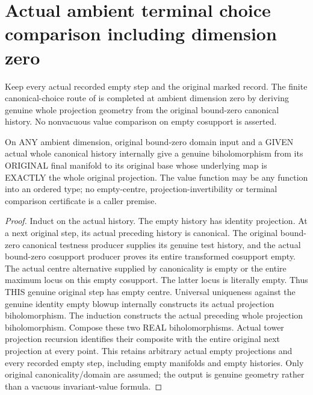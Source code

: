 \section{Actual ambient terminal choice comparison including dimension zero}

Keep every actual recorded empty step and the original marked record.
The finite canonical-choice route of
\cite{wlodarczyk05-hironaka,bierstone-milman08-functoriality} is completed
at ambient dimension zero by deriving genuine whole projection geometry
from the original bound-zero canonical history. No nonvacuous value
comparison on empty cosupport is asserted.

\begin{theorem}
\label{hir:original-bound-zero-canonical-whole-projection-biholomorphism}
\leanok
On ANY ambient dimension, original bound-zero domain input and a GIVEN
actual whole canonical history internally give a genuine biholomorphism
from its ORIGINAL final manifold to its original base whose underlying
map is EXACTLY the whole original projection. The value function may be
any function into an ordered type; no empty-centre, projection-invertibility
or terminal comparison certificate is a caller premise.
\end{theorem}
\begin{proof}
Induct on the actual history. The empty history has identity projection.
At a next original step, its actual preceding history is canonical. The
original bound-zero canonical testness producer supplies its genuine test
history, and the actual bound-zero cosupport producer proves its entire
transformed cosupport empty. The actual centre alternative supplied by
canonicality is empty or the entire maximum locus on this empty cosupport.
The latter locus is literally empty. Thus THIS genuine original step has
empty centre. Universal uniqueness against the genuine identity empty
blowup internally constructs its actual projection biholomorphism. The
induction constructs the actual preceding whole projection biholomorphism.
Compose these two REAL biholomorphisms. Actual tower projection recursion
identifies their composite with the entire original next projection at
every point. This retains arbitrary actual empty projections and every
recorded empty step, including empty manifolds and empty histories. Only
original canonicality/domain are assumed; the output is genuine geometry
rather than a vacuous invariant-value formula.
\end{proof}


